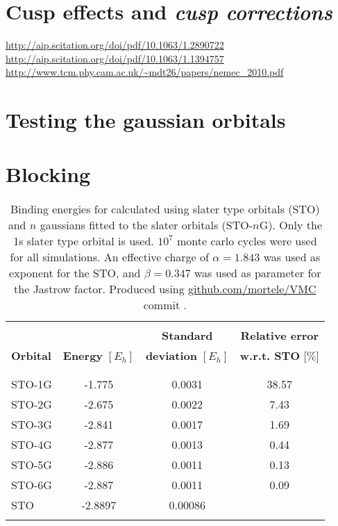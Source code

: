 \documentclass[../../master.tex]{subfiles}
\begin{document}
\section{Cusp effects and \emph{cusp corrections}}


\url{http://aip.scitation.org/doi/pdf/10.1063/1.2890722}
\url{http://aip.scitation.org/doi/pdf/10.1063/1.1394757}
\url{http://www.tcm.phy.cam.ac.uk/~mdt26/papers/nemec_2010.pdf}



\section{Testing the gaussian orbitals}

\section{Blocking}


\begin{table}
\centering{}
\setlength\extrarowheight{2pt}
\begin{tabularx}{\textwidth}{X *{3}{S[table-format=-1.3,table-space-text-post=***]}}
\hline
\hline
\\[-0.9em]
                 &                          & \textbf{Standard}          & \textbf{Relative error}    \\
\textbf{Orbital} & \textbf{Energy} $[E_h]$  & \textbf{deviation} $[E_h]$ & \textbf{w.r.t. STO} [$\%$]  \\
\\[-0.9em]
\hline
\\[-0.9em]
STO-1G & -1.775  & 0.0031  &  38.57 \\
STO-2G & -2.675  & 0.0022  &   7.43 \\
STO-3G & -2.841  & 0.0017  &   1.69 \\
STO-4G & -2.877  & 0.0013  &   0.44 \\
STO-5G & -2.886  & 0.0011  &   0.13 \\
STO-6G & -2.887  & 0.0011  &   0.09 \\
STO    & -2.8897 & 0.00086 & \\
\\[-0.9em]
\hline
\end{tabularx}
\caption{Binding energies for  calculated using slater type orbitals (STO) and $n$ gaussians fitted to the slater orbitals (STO-$n$G). Only the 1s slater type orbital is used. $10^7$ monte carlo cycles were used for all simulations. An effective charge of $\alpha=1.843$ was used as exponent for the STO, and $\beta=0.347$ was used as parameter for the Jastrow factor. Produced using \url{github.com/mortele/VMC} commit . \label{tab:vmcv1}}
\end{table}
\end{document}
